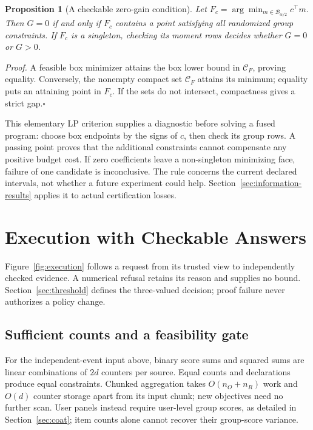 \documentclass[conference]{IEEEtran}
\newtheorem{proposition}{Proposition}
\newcommand{\C}{\mathcal{C}}
\begin{document}
\begin{proposition}[A checkable zero-gain condition]\label{prop:box-face}
Let $F_c=\arg\min_{m\in\mathcal B_{\alpha/2}}c^\top m$. Then $G=0$ if and only if $F_c$ contains a point satisfying all randomized group constraints. If $F_c$ is a singleton, checking its moment rows decides whether $G=0$ or $G>0$.
\end{proposition}
\noindent\textit{Proof.} A feasible box minimizer attains the box lower bound in $\C_F$, proving equality. Conversely, the nonempty compact set $\C_F$ attains its minimum; equality puts an attaining point in $F_c$. If the sets do not intersect, compactness gives a strict gap.\hfill$\square$

This elementary LP criterion supplies a diagnostic before solving a fused program: choose box endpoints by the signs of $c$, then check its group rows. A passing point proves that the additional constraints cannot compensate any positive budget cost. If zero coefficients leave a non-singleton minimizing face, failure of one candidate is inconclusive. The rule concerns the current declared intervals, not whether a future experiment could help. Section~\ref{sec:information-results} applies it to actual certification losses.

\section{Execution with Checkable Answers}\label{sec:execution}
Figure~\ref{fig:execution} follows a request from its trusted view to independently checked evidence. A numerical refusal retains its reason and supplies no bound. Section~\ref{sec:threshold} defines the three-valued decision; proof failure never authorizes a policy change.



\subsection{Sufficient counts and a feasibility gate}
For the independent-event input above, binary score sums and squared sums are linear combinations of $2d$ counters per source. Equal counts and declarations produce equal constraints. Chunked aggregation takes $O(n_O+n_R)$ work and $O(d)$ counter storage apart from its input chunk; new objectives need no further scan. User panels instead require user-level group scores, as detailed in Section~\ref{sec:coat}; item counts alone cannot recover their group-score variance.
\end{document}
